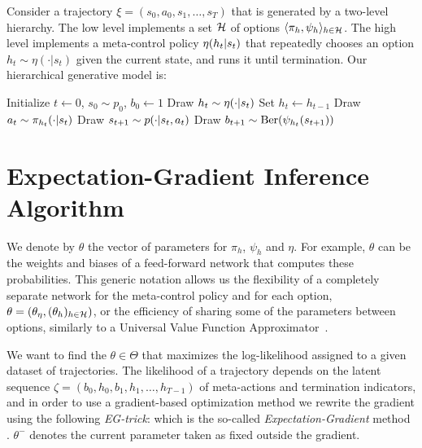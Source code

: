 Consider a trajectory $\xi=(s_0,a_0,s_1,\ldots,s_T)$ that is generated by a two-level hierarchy. The low level implements a set $\mathcal{H}$ of options $\langle \pi_h, \psi_h \rangle_{h\in\mathcal{H}}$. The high level implements a meta-control policy $\eta(h_t \vert s_t)$ that repeatedly chooses an option $h_t\sim\eta(\cdot|s_t)$ given the current state, and runs it until termination. Our hierarchical generative model is:
\begin{algorithmic}
    \State Initialize $t\gets0$, $s_0 \sim p_0$, $b_0 \gets 1$
            \State Draw $h_t \sim \eta(\cdot \vert s_t)$
        \Else{}
            \State Set $h_t \gets h_{t-1}$
        \EndIf
        \State Draw $a_t \sim \pi_{h_t}(\cdot \vert s_t)$
	\State Draw $s_{t+1} \sim p(\cdot \vert s_t, a_t)$
	\State Draw $b_{t+1} \sim \mathrm{Ber}(\psi_{h_t}(s_{t+1}))$
    \EndFor
\end{algorithmic}


\section{Expectation-Gradient Inference Algorithm}
We denote by $\theta$ the vector of parameters for $\pi_h$, $\psi_h$ and $\eta$. For example, $\theta$ can be the weights and biases of a feed-forward network that computes these probabilities. This generic notation allows us the flexibility of a completely separate network for the meta-control policy and for each option, $\theta=(\theta_\eta,(\theta_h)_{h\in\mathcal{H}})$, or the efficiency of sharing some of the parameters between options, similarly to a Universal Value Function Approximator~\cite{schaul2015universal}.

We want to find the $\theta\in\Theta$ that maximizes the log-likelihood assigned to a given dataset of trajectories. The likelihood of a trajectory depends on the latent sequence $\zeta = (b_0,h_0,b_1,h_1,\ldots,h_{T-1})$ of meta-actions and termination indicators, and in order to use a gradient-based optimization method we rewrite the gradient using the following \emph{EG-trick}:
which is the so-called \emph{Expectation-Gradient} method \cite{salakhutdinov2003optimization,mclachlan2007algorithm}. $\theta^-$ denotes the current parameter taken as fixed outside the gradient.

